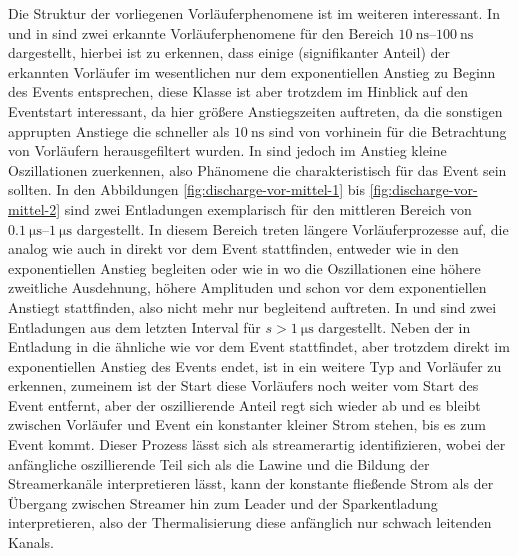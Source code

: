 Die Struktur der vorliegenen Vorläuferphenomene ist im weiteren interessant. In  und in  sind zwei erkannte Vorläuferphenomene für den Bereich \(\SIrange{10}{100}{\nano\second}\) dargestellt, hierbei ist zu erkennen, dass einige (signifikanter Anteil) der erkannten Vorläufer im wesentlichen nur dem exponentiellen Anstieg zu Beginn des Events entsprechen, diese Klasse ist aber trotzdem im Hinblick auf den Eventstart interessant, da hier größere Anstiegszeiten auftreten, da die sonstigen apprupten Anstiege die schneller als \(\SI{10}{\nano\second}\) sind von vorhinein für die Betrachtung von Vorläufern herausgefiltert wurden. In  sind jedoch im Anstieg kleine Oszillationen zuerkennen, also Phänomene die charakteristisch für das Event sein sollten. In den Abbildungen \ref{fig:discharge-vor-mittel-1} bis \ref{fig:discharge-vor-mittel-2} sind zwei Entladungen exemplarisch für den mittleren Bereich von \(\SIrange{0,1}{1}{\micro\second}\) dargestellt. In diesem Bereich treten längere Vorläuferprozesse auf, die analog wie auch in  direkt vor dem Event stattfinden, entweder wie in  den exponentiellen Anstieg begleiten oder wie in  wo die Oszillationen eine höhere zweitliche Ausdehnung, höhere Amplituden und schon vor dem exponentiellen Anstiegt stattfinden, also nicht mehr nur begleitend auftreten. In  und  sind zwei Entladungen aus dem letzten Interval für \(s > \SI{1}{\micro\second}\) dargestellt. Neben der in Entladung in  die ähnliche wie  vor dem Event stattfindet, aber trotzdem direkt im exponentiellen Anstieg des Events endet, ist in  ein weitere Typ and Vorläufer zu erkennen, zumeinem ist der Start diese Vorläufers noch weiter vom Start des Event entfernt, aber der oszillierende Anteil regt sich wieder ab und es bleibt zwischen Vorläufer und Event ein konstanter kleiner Strom stehen, bis es zum Event kommt. Dieser Prozess lässt sich als streamerartig identifizieren, wobei der anfängliche oszillierende Teil sich als die Lawine und die Bildung der Streamerkanäle interpretieren lässt, kann der konstante fließende Strom als der Übergang zwischen Streamer hin zum Leader und der Sparkentladung interpretieren, also der Thermalisierung diese anfänglich nur schwach leitenden Kanals.

